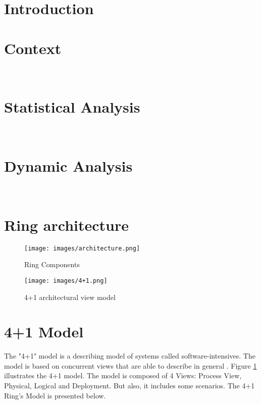 {
\graphicspath{{TP1/}}
\newpage
\section{Introduction}
\label{sec:TP1/introduction}



%

\section{Context}\
\label{sec:TP1/context}


\section{Statistical Analysis}\
\label{sec:TP1/static}


\section{Dynamic Analysis}\
\label{sec:TP1/dynamic}


\section{Ring architecture}
\begin{figure}[h!]
\centering
\texttt{[image: images/architecture.png]}
\caption{Ring Components}
\end{figure}
\begin{figure}[h!]

\centering
\texttt{[image: images/4+1.png]}
\caption{4+1 architectural view model \cite{modeling}}
\label{fig:4+1 arch}
\end{figure}

\section{4+1 Model}
The "4+1" model is a describing model of systems called software-intensives. The model is based on concurrent views that are able to describe in general \cite{blueprints}. Figure \ref{fig:4+1 arch} illustrates the 4+1 model.
The model is composed of 4 Views: Process View, Physical, Logical and Deployment. But also, it includes some scenarios. The 4+1 Ring's Model is presented below.

}
